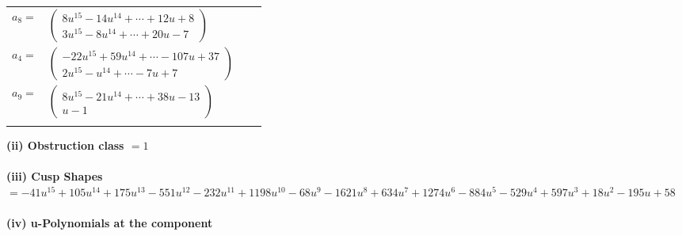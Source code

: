 \documentclass[1p]{elsarticle_modified}
\theoremstyle{definition}
\begin{document}
\begin{tabular}{m{7pt} m{180pt} m{7pt} m{180pt} }
\flushright $a_{8}=$&$\begin{pmatrix}8 u^{15}-14 u^{14}+\cdots+12 u+8\\3 u^{15}-8 u^{14}+\cdots+20 u-7\end{pmatrix}$ \\
\flushright $a_{4}=$&$\begin{pmatrix}-22 u^{15}+59 u^{14}+\cdots-107 u+37\\2 u^{15}- u^{14}+\cdots-7 u+7\end{pmatrix}$ \\
\flushright $a_{9}=$&$\begin{pmatrix}8 u^{15}-21 u^{14}+\cdots+38 u-13\\u-1\end{pmatrix}$\\&\end{tabular}
\flushleft \textbf{(ii) Obstruction class $= 1$}\\~\\
\flushleft \textbf{(iii) Cusp Shapes $= -41 u^{15}+105 u^{14}+175 u^{13}-551 u^{12}-232 u^{11}+1198 u^{10}-68 u^9-1621 u^8+634 u^7+1274 u^6-884 u^5-529 u^4+597 u^3+18 u^2-195 u+58$}\\~\\
\newpage\renewcommand{\arraystretch}{1}
\flushleft \textbf{(iv) u-Polynomials at the component}\newline \\
\end{document}

